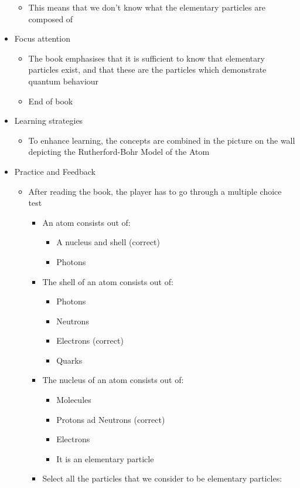 \documentclass[11pt,twoside]{report} %
\begin{document}
\begin{itemize}
\begin{itemize}
			\item This means that we don’t know what the elementary particles are composed of
		\end{itemize}
		\item Focus attention
		\begin{itemize}
			\item The book emphasises that it is sufficient to know that elementary particles exist, and that these are the particles which demonstrate quantum behaviour
			\item {End of book}
		\end{itemize}
		\item Learning strategies
		\begin{itemize}
			\item To enhance learning, the concepts are combined in the picture on the wall depicting the Rutherford-Bohr Model of the Atom
		\end{itemize}
		\item Practice and Feedback
		\begin{itemize}
			\item After reading the book, the player has to go through a multiple choice test
			\begin{itemize}
				\item An atom consists out of:
				\begin{itemize}
					\item A nucleus and shell (correct)
					\item Photons
				\end{itemize}
				\item The shell of an atom consists out of:
				\begin{itemize}
					\item Photons
					\item Neutrons
					\item Electrons (correct)
					\item Quarks
				\end{itemize}
				\item The nucleus of an atom consists out of:
				\begin{itemize}
					\item Molecules
					\item Protons ad Neutrons (correct)
					\item Electrons
					\item It is an elementary particle
				\end{itemize}
				\item Select all the particles that we consider to be elementary particles:

\end{itemize}
\end{itemize}
\end{itemize}
\end{document}
